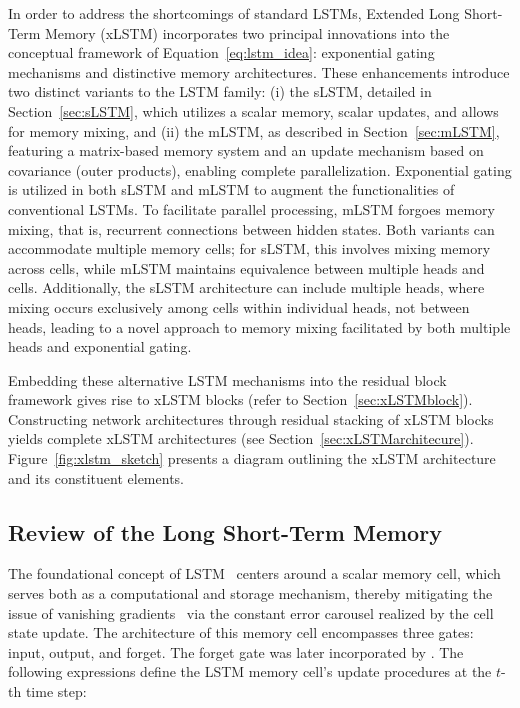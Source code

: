 In order to address the shortcomings of standard LSTMs, Extended Long Short-Term Memory (xLSTM) incorporates two principal innovations into the conceptual framework of Equation~\eqref{eq:lstm_idea}: exponential gating mechanisms and distinctive memory architectures. These enhancements introduce two distinct variants to the LSTM family: (i) the sLSTM, detailed in Section~\ref{sec:sLSTM}, which utilizes a scalar memory, scalar updates, and allows for memory mixing, and (ii) the mLSTM, as described in Section~\ref{sec:mLSTM}, featuring a matrix-based memory system and an update mechanism based on covariance (outer products), enabling complete parallelization. Exponential gating is utilized in both sLSTM and mLSTM to augment the functionalities of conventional LSTMs. To facilitate parallel processing, mLSTM forgoes memory mixing, that is, recurrent connections between hidden states. Both variants can accommodate multiple memory cells; for sLSTM, this involves mixing memory across cells, while mLSTM maintains equivalence between multiple heads and cells. Additionally, the sLSTM architecture can include multiple heads, where mixing occurs exclusively among cells within individual heads, not between heads, leading to a novel approach to memory mixing facilitated by both multiple heads and exponential gating. 

Embedding these alternative LSTM mechanisms into the residual block framework gives rise to xLSTM blocks (refer to Section~\ref{sec:xLSTMblock}). Constructing network architectures through residual stacking of xLSTM blocks yields complete xLSTM architectures (see Section~\ref{sec:xLSTMarchitecure}). Figure~\ref{fig:xlstm_sketch} presents a diagram outlining the xLSTM architecture and its constituent elements.

\subsection{Review of the Long Short-Term Memory}
\label{sec:orgLSTM}

The foundational concept of LSTM~\citep{Hochreiter:91,Hochreiter:97nips,Hochreiter:97} centers around a scalar memory cell, which serves both as a computational and storage mechanism, thereby mitigating the issue of vanishing gradients~\citep{Hochreiter:91,Hochreiter:00book} via the constant error carousel realized by the cell state update. The architecture of this memory cell encompasses three gates: input, output, and forget. The forget gate was later incorporated by \citet{Gers:00}. 
The following expressions define the LSTM memory cell's update procedures at the $t$-th time step:


